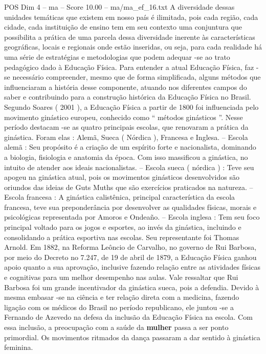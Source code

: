 \begin{textsample}{POS Dim 4 – ma – Score 10.00 – ma/ma\_ef\_16.txt}
A diversidade dessas unidades temáticas que existem em nosso país é ilimitada, pois cada região, cada cidade, cada instituição de ensino tem em seu contexto uma conjuntura que possibilita a prática de uma parcela dessa diversidade inerente às características geográficas, locais e regionais onde estão inseridas, ou seja, para cada realidade há uma série de estratégias e metodologias que podem adequar -se ao trato pedagógico dado à Educação Física.
Para entender a atual Educação Física, faz -se necessário compreender, mesmo que de forma simplificada, alguns métodos que influenciaram a história desse componente, atuando nos diferentes campos do saber e contribuindo para a construção histórica da Educação Física no Brasil.
Segundo Soares ( 2001 ), a Educação Física a partir de 1800 foi influenciada pelo movimento ginástico europeu, conhecido como “ métodos ginásticos ”.
Nesse período destacam -se as quatro principais escolas, que renovaram a prática da ginástica.
Foram elas : Alemã, Sueca ( Nórdica ), Francesa e Inglesa. – Escola alemã : Seu propósito é a criação de um espírito forte e nacionalista, dominando a biologia, fisiologia e anatomia da época.
Com isso massificou a ginástica, no intuito de atender aos ideais nacionalistas. – Escola sueca ( nórdica ) : Teve seu apogeu na ginástica atual, pois os movimentos ginásticos desenvolvidos são oriundos das ideias de Guts Muths que são exercícios praticados na natureza. – Escola francesa : A ginástica calistênica, principal característica da escola francesa, teve sua preponderância por desenvolver as qualidades físicas, morais e psicológicas representada por Amoros e Ondeaño. – Escola inglesa : Tem seu foco principal voltado para os jogos e esportes, ao invés da ginástica, incluindo e consolidando a prática esportiva nas escolas.
Seu representante foi Thomas Arnold.
Em 1882, na Reforma Leôncio de Carvalho, no governo de Rui Barbosa, por meio do Decreto no 7.247, de 19 de abril de 1879, a Educação Física ganhou apoio quanto a sua aprovação, inclusive fazendo relação entre as atividades físicas e cognitivas para um melhor desempenho nas aulas.
Vale ressaltar que Rui Barbosa foi um grande incentivador da ginástica sueca, pois a defendia.
Devido à mesma embasar -se na ciência e ter relação direta com a medicina, fazendo ligação com os médicos do Brasil no período republicano, ele juntou -se a Fernando de Azevedo na defesa da inclusão da Educação Física na escola.
Com essa inclusão, a preocupação com a saúde da \textbf{mulher} passa a ser ponto primordial.
Os movimentos ritmados da dança passaram a dar sentido à ginástica feminina.

\end{textsample}
